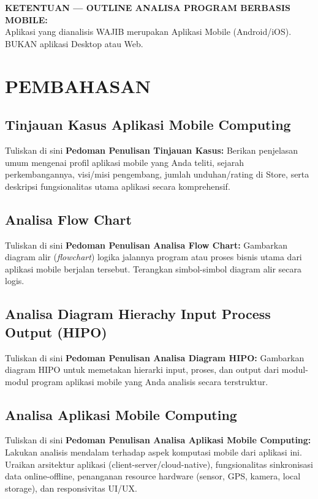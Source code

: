 \noindent\textbf{KETENTUAN — OUTLINE ANALISA PROGRAM BERBASIS MOBILE:} \\
Aplikasi yang dianalisis WAJIB merupakan Aplikasi Mobile (Android/iOS). BUKAN aplikasi Desktop atau Web.

\vspace{0.5cm}
\chapter{PEMBAHASAN}
\section{Tinjauan Kasus Aplikasi Mobile Computing}


Tuliskan di sini \textbf{Pedoman Penulisan Tinjauan Kasus:} Berikan penjelasan umum mengenai profil aplikasi mobile yang Anda teliti, sejarah perkembangannya, visi/misi pengembang, jumlah unduhan/rating di Store, serta deskripsi fungsionalitas utama aplikasi secara komprehensif.


\section{Analisa Flow Chart}


Tuliskan di sini \textbf{Pedoman Penulisan Analisa Flow Chart:} Gambarkan diagram alir (\textit{flowchart}) logika jalannya program atau proses bisnis utama dari aplikasi mobile berjalan tersebut. Terangkan simbol-simbol diagram alir secara logis.


\section{Analisa Diagram Hierachy Input Process Output (HIPO)}


Tuliskan di sini \textbf{Pedoman Penulisan Analisa Diagram HIPO:} Gambarkan diagram HIPO untuk memetakan hierarki input, proses, dan output dari modul-modul program aplikasi mobile yang Anda analisis secara terstruktur.


\section{Analisa Aplikasi Mobile Computing}


Tuliskan di sini \textbf{Pedoman Penulisan Analisa Aplikasi Mobile Computing:} Lakukan analisis mendalam terhadap aspek komputasi mobile dari aplikasi ini. Uraikan arsitektur aplikasi (client-server/cloud-native), fungsionalitas sinkronisasi data online-offline, penanganan resource hardware (sensor, GPS, kamera, local storage), dan responsivitas UI/UX.


